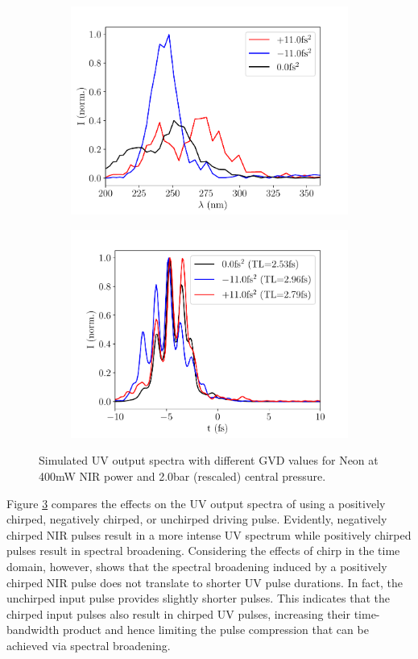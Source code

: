 \documentclass[a4paper]{jpconf}
\begin{document}
\begin{figure}[h]
\centering
 \begin{subfigure}{0.5\textwidth}
\includegraphics[width=\textwidth]{im/Ne_chirp}
\caption{}\label{im:chirp_Ar}
\end{subfigure}
 \begin{subfigure}{0.5\textwidth}
\includegraphics[width=\textwidth]{im/temporal_Ne_chirp}
\caption{}\label{im:chirp_Ne}
\end{subfigure}
\caption{Simulated UV output spectra with different GVD values for Neon at 400mW NIR power and 2.0bar (rescaled) central pressure.}\label{im:chirp}
\end{figure}
Figure \ref{im:chirp} compares the effects on the UV output spectra of using a positively chirped, negatively chirped, or unchirped driving pulse. Evidently,  negatively chirped NIR pulses result in a more intense UV spectrum while positively chirped pulses result in spectral broadening. Considering the effects of chirp in the time domain, however, shows that the spectral broadening induced by a positively chirped NIR pulse does not translate to shorter UV pulse durations. In fact, the unchirped input pulse provides slightly shorter pulses. This indicates that the chirped input pulses also result in chirped UV pulses, increasing their time-bandwidth product and hence limiting the pulse compression that can be achieved via spectral broadening. \par 
\end{document}
